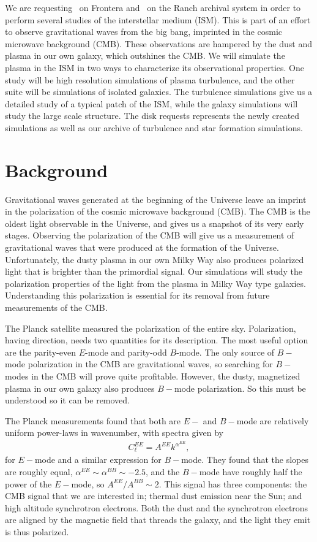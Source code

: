 
We are requesting \request\ on Frontera and \disk\ on the Ranch archival system in order to perform several studies of
the interstellar medium (ISM).  This is part of an effort to observe
gravitational waves from the big bang, imprinted in the cosmic microwave background (CMB).  These observations are hampered by the
dust and plasma in our own galaxy, which outshines the CMB.  We will simulate
the plasma in the ISM in two ways to characterize its observational properties.
One study will be high resolution simulations of plasma turbulence, and the
other suite will be simulations of isolated galaxies.  The turbulence
simulations give us a detailed study of a typical patch of the ISM, while the
galaxy simulations will study the large scale structure.  The disk requests
represents the newly created simulations as well as our archive of turbulence
and star formation simulations.

\section{Background}

Gravitational waves generated at
the beginning of the Universe leave an imprint in the polarization of the cosmic
microwave background (CMB).  The CMB is the oldest light observable in the
Universe, and gives us a snapshot of its very early stages.
Observing the polarization of the CMB will give us a measurement of
gravitational waves that were produced at the formation of the Universe.
Unfortunately, the dusty plasma in our own Milky Way also produces polarized
light that is brighter than the primordial signal.  Our simulations will study
the polarization properties of the light from the plasma in Milky Way type
galaxies.  Understanding this polarization is essential for its removal from
future measurements of the CMB.

The Planck satellite \citep{Planck18xi}  measured the polarization of the entire sky.  Polarization,
having direction, needs two quantities for its description. The most
useful option are the parity-even $E$-mode and parity-odd $B$-mode.  
The only source of $B-$ mode polarization in the CMB are gravitational waves,
so searching for $B-$modes in the CMB will prove quite profitable.  However, the
dusty, magnetized plasma in our own galaxy also produces
$B-$mode polarization.  So this must be understood so it can be removed.  

The Planck measurements 
found that both are $E-$ and $B-$mode are relatively uniform power-laws in wavenumber, 
with spectra given by
\begin{align}
C_\ell^{EE} = A^{EE} k^{\alpha^{EE}},
\end{align}
for $E-$mode and a similar expression for $B-$mode.  They found that the slopes
are roughly equal, $\alpha^{EE}\sim\alpha^{BB}\sim-2.5$, and the $B-$mode have
roughly half the power of the $E-$mode, so $A^{EE}/A^{BB}\sim 2$.  This signal
has three components: the CMB signal that we are interested in; thermal dust
emission near the Sun; and high altitude synchrotron electrons.  Both the dust
and the synchrotron electrons are aligned by the magnetic field that threads the
galaxy, and the light they emit is thus polarized.  

